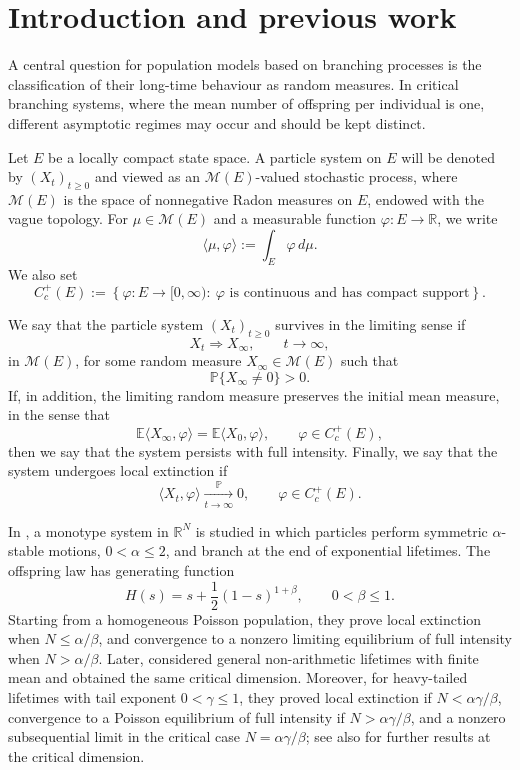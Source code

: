 \documentclass[reqno,final,11pt]{amsart}
\newcommand{\1}{\mathbbm{1}}
\renewcommand{\cite}{\citet}
\theoremstyle{plain}
\theoremstyle{definition}
\theoremstyle{remark}
\begin{document}
\section{Introduction and previous work}

A central question for population models based on branching processes is the classification of
their long-time behaviour as random measures. In critical branching systems, where the mean
number of offspring per individual is one, different asymptotic regimes may occur and should be
kept distinct.

Let $E$ be a locally compact state space. A particle system on $E$ will be denoted by
$(X_t)_{t\ge0}$ and viewed as an $\mathcal M(E)$-valued stochastic process, where
$\mathcal M(E)$ is the space of nonnegative Radon measures on $E$, endowed with the vague
topology. For $\mu\in\mathcal M(E)$ and a measurable function $\varphi:E\to\mathbb R$, we write
\[
\langle \mu,\varphi\rangle:=\int_E \varphi\,d\mu .
\]
We also set
\[
C_c^+(E):=
\left\{
\varphi:E\to[0,\infty):\ \varphi \text{ is continuous and has compact support}
\right\}.
\]

We say that the particle system $(X_t)_{t\ge0}$ survives in the limiting sense if
\[
X_t \Rightarrow X_\infty,\qquad t\to\infty,
\]
in $\mathcal M(E)$, for some random measure $X_\infty\in\mathcal M(E)$ such that
\[
\mathbb P\{X_\infty\neq 0\}>0.
\]
If, in addition, the limiting random measure preserves the initial mean measure, in the sense that
\[
\mathbb E\langle X_\infty,\varphi\rangle
=
\mathbb E\langle X_0,\varphi\rangle,
\qquad \varphi\in C_c^+(E),
\]
then we say that the system persists with full intensity. Finally, we say that the system undergoes
local extinction if
\[
\langle X_t,\varphi\rangle
\xrightarrow[t\to\infty]{\mathbb P}0,
\qquad \varphi\in C_c^+(E).
\]

In \cite{GW}, a monotype system in $\mathbb R^N$ is studied in which particles perform
symmetric $\alpha$-stable motions, $0<\alpha\le2$, and branch at the end of exponential lifetimes.
The offspring law has generating function
\[
H(s)=s+\frac12(1-s)^{1+\beta},\qquad 0<\beta\le1.
\]
Starting from a homogeneous Poisson population, they prove local extinction when
$N\le \alpha/\beta$, and convergence to a nonzero limiting equilibrium of full intensity when
$N>\alpha/\beta$. Later, \cite{VW} considered general non-arithmetic lifetimes with finite mean
and obtained the same critical dimension. Moreover, for heavy-tailed lifetimes with tail exponent
$0<\gamma\le1$, they proved local extinction if $N<\alpha\gamma/\beta$, convergence to a
Poisson equilibrium of full intensity if $N>\alpha\gamma/\beta$, and a nonzero subsequential
limit in the critical case $N=\alpha\gamma/\beta$; see also \cite{FVW} for further results at the
critical dimension.
\end{document}
